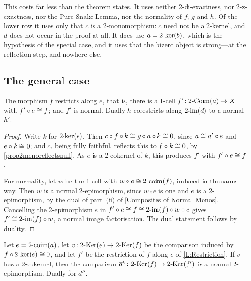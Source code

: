 \begin{remark}
  \label{Rem BarA Cost}
  This costs far less than the theorem states. It uses neither 2-di-exactness, nor 2-z-exactness, nor the Pure Snake Lemma, nor the normality of \(f\), \(g\) and \(h\). Of the lower row it uses only that \(c\) is a 2-monomorphism: \(c\) need not be a 2-kernel, and \(d\) does not occur in the proof at all. It does use \(a=2\text{-}\mathrm{ker}(b)\), which is the hypothesis of the special case, and it uses that the bizero object is strong---at the reflection step, and nowhere else.
\end{remark}

\subsection{The general case}\label{SS:GeneralCase}

\begin{lemma}
  \label{L:Restriction}   \leanok
  The morphism \(f\) restricts along \(e\), that is, there is a 1-cell \(f'\colon2\text{-}\mathrm{Coim}(a)\to X\) with \(f'\circ e\cong f\); and \(f'\) is normal. Dually \(h\) corestricts along \(2\text{-}\mathrm{im}(d)\) to a normal \(h'\).
\end{lemma}

\begin{proof}
  \leanok
  Write \(k\) for \(2\text{-}\mathrm{ker}(e)\). Then \(c\circ f\circ k\cong g\circ a\circ k\cong 0\), since \(a\cong a'\circ e\) and \(e\circ k\cong 0\); and \(c\), being fully faithful, reflects this to \(f\circ k\cong 0\), by \prox\ref{prop2monoreflectsnull}. As \(e\) is a 2-cokernel of \(k\), this produces \(f'\) with \(f'\circ e\cong f\).

	For normality, let \(w\) be the 1-cell with \(w\circ e\cong2\text{-}\mathrm{coim}(f)\), induced in the same way. Then \(w\) is a normal 2-epimorphism, since \(w\comp e\) is one and \(e\) is a 2-epimorphism, by the dual of part~\textup{(ii)} of \prox\ref{Composites of Normal Monos}. Cancelling the 2-epimorphism \(e\) in \(f'\circ e\cong f\cong2\text{-}\mathrm{im}(f)\circ w\circ e\) gives \(f'\cong2\text{-}\mathrm{im}(f)\circ w\), a normal image factorisation. The dual statement follows by duality.
\end{proof}

\begin{proposition}
  \label{P:KerComparison}   \leanok
  Let \(e=2\text{-}\mathrm{coim}(a)\), let \(v\colon2\text{-}\mathrm{Ker}(e)\to2\text{-}\mathrm{Ker}(f)\) be the comparison induced by \(f\circ2\text{-}\mathrm{ker}(e)\cong 0\), and let \(f'\) be the restriction of \(f\) along \(e\) of \lemx\ref{L:Restriction}. If \(v\) has a 2-cokernel, then the comparison \(\overline{a}''\colon2\text{-}\mathrm{Ker}(f)\to2\text{-}\mathrm{Ker}(f')\) is a normal 2-epimorphism. Dually for \(\underline{d}''\).
\end{proposition}

